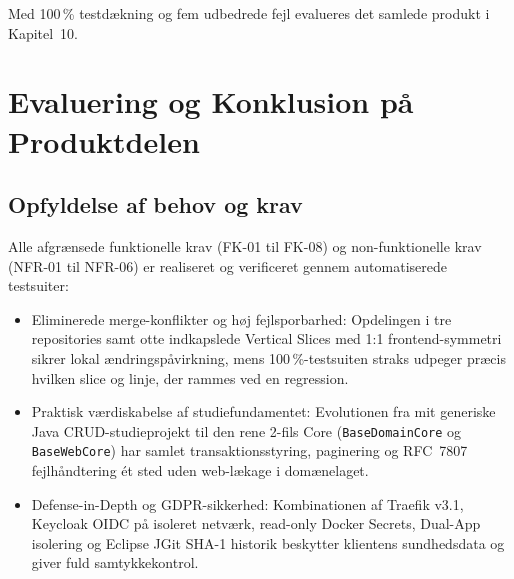 \documentclass[11pt,a4paper]{article}
\begin{document}
Med 100\,\% testdækning og fem udbedrede fejl evalueres det samlede produkt i Kapitel~10.

\section{Evaluering og Konklusion på Produktdelen}

\subsection{Opfyldelse af behov og krav}
Alle afgrænsede funktionelle krav (FK-01 til FK-08) og non-funktionelle krav (NFR-01 til NFR-06) er realiseret og verificeret gennem automatiserede testsuiter:
\begin{itemize}[noitemsep]
    \item Eliminerede merge-konflikter og høj fejlsporbarhed: Opdelingen i tre repositories samt otte indkapslede Vertical Slices med 1:1 frontend-symmetri sikrer lokal ændringspåvirkning, mens 100\,\%-testsuiten straks udpeger præcis hvilken slice og linje, der rammes ved en regression.
    \item Praktisk værdiskabelse af studiefundamentet: Evolutionen fra mit generiske Java CRUD-studieprojekt til den rene 2-fils Core (\texttt{BaseDomainCore} og \texttt{BaseWebCore}) har samlet transaktionsstyring, paginering og RFC~7807 fejlhåndtering ét sted uden web-lækage i domænelaget.
    \item Defense-in-Depth og GDPR-sikkerhed: Kombinationen af Traefik v3.1, Keycloak OIDC på isoleret netværk, read-only Docker Secrets, Dual-App isolering og Eclipse JGit SHA-1 historik beskytter klientens sundhedsdata og giver fuld samtykkekontrol.
\end{itemize}
\end{document}
